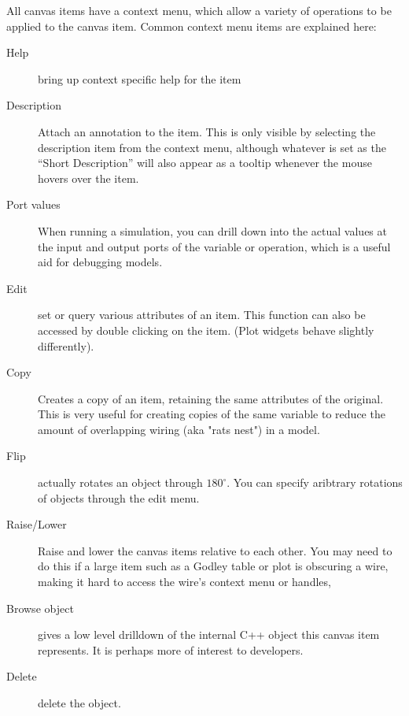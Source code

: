 All canvas items have a context menu, which allow a variety of
operations to be applied to the canvas item. Common context menu items
are explained here:
\begin{description}
\item[Help] bring up context specific help for the item
\item[Description] Attach an annotation to the item. This is only
visible by selecting the description item from the context menu,
although whatever is set as the ``Short Description'' will also appear
as a tooltip whenever the mouse hovers over the item.
\item[Port values] When running a simulation, you can drill down into
the actual values at the input and output ports of the variable or
operation, which is a useful aid for debugging models.
\item[Edit] set or query various attributes of an item. This function
can also be accessed by double clicking on the item. (Plot widgets
behave slightly differently).
\item[Copy] Creates a copy of an item, retaining the same attributes
of the original. This is very useful for creating copies of the same
variable to reduce the amount of overlapping wiring (aka "rats nest")
in a model.
\item[Flip] actually rotates an object through $180^\circ$. You can
specify aribtrary rotations of objects through the edit menu.
\item[Raise/Lower] Raise and lower the canvas items relative to each
other. You may need to do this if a large item such as a Godley table
or plot is obscuring a wire, making it hard to access the wire's
context menu or handles,
\item[Browse object] gives a low level drilldown of the internal C++
object this canvas item represents. It is perhaps more of interest to
developers. 
\item[Delete] delete the object.
\end{description}

